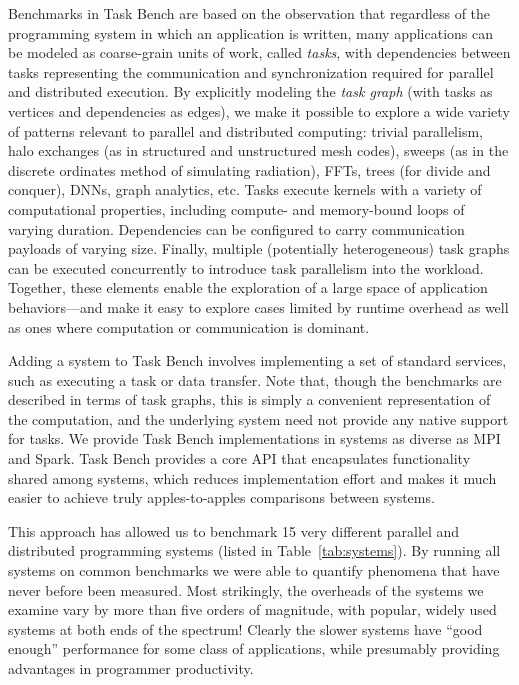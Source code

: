 Benchmarks in Task Bench are based on the observation that regardless
of the programming system in which an application is written, many
applications can be modeled as coarse-grain units of work, called
\emph{tasks}, with dependencies between tasks representing the
communication and synchronization required for parallel and
distributed execution. By explicitly modeling the \emph{task graph}
(with tasks as vertices and dependencies as edges), we make it
possible to explore a wide variety of patterns relevant to
parallel and distributed computing: trivial parallelism, halo exchanges (as
in structured and unstructured mesh codes), sweeps (as
in the discrete ordinates method of simulating radiation), FFTs, trees
(for divide and conquer), DNNs, graph analytics, etc. Tasks execute kernels with a
variety of computational properties, including compute- and
memory-bound loops of varying duration. Dependencies can be configured to carry communication payloads of varying size. Finally, multiple
(potentially heterogeneous) task graphs can be executed concurrently
to introduce task parallelism into the workload. Together, these
elements enable the exploration of a large space of application
behaviors---and make it easy to explore cases limited by runtime
overhead as well as ones where computation or communication is
dominant.

Adding a system to Task Bench involves implementing a set of standard
services, such as executing a task or data transfer. Note that, though
the benchmarks are described in terms of task graphs, this is simply a
convenient representation of the computation, and the underlying
system need not provide any native support for tasks. We provide
Task Bench implementations in systems as diverse as MPI and
Spark. Task Bench provides a core API that encapsulates functionality
shared among systems, which reduces implementation effort and makes it
much easier to achieve truly apples-to-apples comparisons between
systems.

This approach has allowed us to benchmark 15 very different parallel
and distributed programming systems (listed in
Table~\ref{tab:systems}).  By running all systems on common benchmarks
we were able to quantify phenomena
that have never before been measured.
Most strikingly, the overheads of the systems we examine vary by more than five orders
of magnitude, with popular, widely used systems at both ends of the spectrum!  Clearly
the slower systems have ``good enough'' performance for some class of applications, while presumably
providing advantages in programmer productivity.


